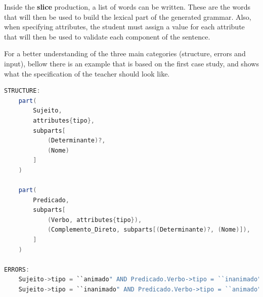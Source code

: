 Inside the \textbf{slice} production, a list of words can be written. These are the words that will then be used to build the lexical part of the generated grammar. Also, when specifying attributes, the student must assign a value for each attribute that will then be used to validate each component of the sentence.

For a better understanding of the three main categories (structure, errors and input), bellow there is an example that is based on the first case study, and shows what the specification of the teacher should look like.
\newpage

\begin{center}
\begin{minipage}{13cm}
\begin{lstlisting}[language=java, basicstyle=\tiny, label={lst:meta_struct_err}, caption=Example of a possible sentence structure]
STRUCTURE:
    part(
        Sujeito, 
        attributes{tipo}, 
        subparts[
            (Determinante)?, 
            (Nome)
        ]
    )
    
    part(
        Predicado,
        subparts[
            (Verbo, attributes{tipo}),
            (Complemento_Direto, subparts[(Determinante)?, (Nome)]),
        ]
    )

ERRORS:
    Sujeito->tipo = ``animado" AND Predicado.Verbo->tipo = ``inanimado";
    Sujeito->tipo = ``inanimado" AND Predicado.Verbo->tipo = ``animado";
\end{lstlisting}
\end{minipage}
\end{center}

%

